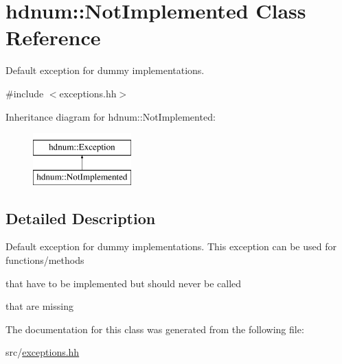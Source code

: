 \hypertarget{classhdnum_1_1NotImplemented}{
\section{hdnum::NotImplemented Class Reference}
\label{classhdnum_1_1NotImplemented}
}


Default exception for dummy implementations.  




{\ttfamily \#include $<$exceptions.hh$>$}

Inheritance diagram for hdnum::NotImplemented:\begin{figure}[H]
\begin{center}
\leavevmode
\includegraphics[height=2cm]{classhdnum_1_1NotImplemented}
\end{center}
\end{figure}


\subsection{Detailed Description}
Default exception for dummy implementations. This exception can be used for functions/methods


\begin{DoxyItemize}
\item that have to be implemented but should never be called
\item that are missing 
\end{DoxyItemize}

The documentation for this class was generated from the following file:\begin{DoxyCompactItemize}
\item 
src/\hyperlink{exceptions_8hh}{exceptions.hh}\end{DoxyCompactItemize}
